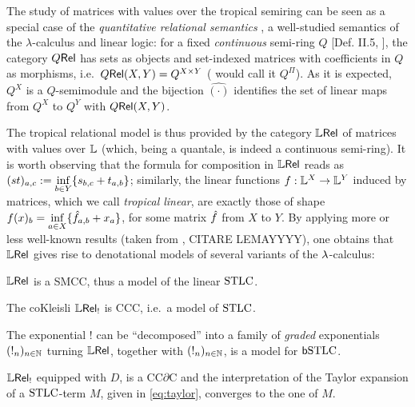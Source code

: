 \documentclass[submission,%
]{eptcs}
\begin{document}
The study of matrices with values over the tropical semiring can be seen as a special case of the
\emph{quantitative relational semantics} \cite{Manzo2013}, a well-studied semantics of the $\lambda$-calculus and linear logic:
for a fixed \emph{continuous} semi-ring $Q$ [Def. II.5, \cite{Manzo2013}], the category $Q \mathsf{Rel}$ has sets as objects and set-indexed matrices with coefficients in $Q$ as morphisms, i.e.~$Q \mathsf{Rel}(X,Y)=Q^{X\times Y}$ (\cite{Manzo2013} would call it $Q^\Pi$).
As it is expected, $Q^X$ is a $Q$-semimodule and the bijection $\hat{(\cdot)}$ identifies the set of linear maps from $Q^X$ to $Q^Y$ with 
 ${Q \mathsf{Rel}}(X,Y)$.

The tropical relational model is thus provided by the category $\mathbb{L} \mathsf{Rel}$ of matrices with values over $\mathbb{L}$ (which, being a quantale, is indeed a continuous semi-ring).
It is worth observing that the formula for composition in $\mathbb{L} \mathsf{Rel}$ %
reads as \ $(st)_{a,c}:=\inf\limits_{b\in Y}\{s_{b,c}+t_{a,b}\}$;
 similarly, the linear functions $f:\mathbb{L}^X\to \mathbb{L}^Y$ induced by matrices, which we call \emph{tropical linear}, are exactly those of shape $f(x)_b=\inf\limits_{a\in X} \{\hat{f}_{a,b}+x_a\}$, for some matrix $\hat{f}$ from $X$ to $Y$.
By applying more or less well-known results (taken from \cite{Manzo2013}, CITARE LEMAYYYY), one obtains that $\mathbb{L} \mathsf{Rel}$ gives rise to denotational models of several variants of the $\lambda$-calculus:

\begin{fact}
 $\mathbb{L} \mathsf{Rel}$ is a SMCC, thus a model of the linear $\mathrm{STLC}$.

 The coKleisli $\mathbb{L} \mathsf{Rel}_!$ is CCC, i.e.\ a model of $\mathrm{STLC}$.

The exponential $!$ can be ``decomposed'' into a family of \emph{graded} exponentials $(!_n)_{n\in\mathbb{N}}$ turning $\mathbb{L} \mathsf{Rel}$, together with $(!_n)_{n\in\mathbb{N}}$, is a model for $\mathsf b\mathrm{STLC}$. 

 $\mathbb{L} \mathsf{Rel}_!$ equipped with $D$, is a CC$\partial$C and the interpretation of the Taylor expansion of a $\mathrm{STLC}$-term $M$, given in \eqref{eq:taylor}, converges to the one of $M$.
\end{fact}
\end{document}
